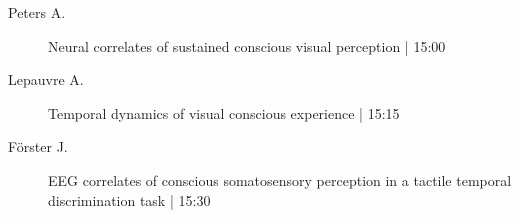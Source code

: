 \begin{symposium}
\begin{description}
                \item [ Peters A.] Neural correlates of sustained conscious visual perception \textcolor{mygray}{ | 15:00}    
                
                \item [ Lepauvre A.] Temporal dynamics of visual conscious experience \textcolor{mygray}{ | 15:15}    
                
                \item [ Förster J.] EEG correlates of conscious somatosensory perception in a tactile temporal discrimination task \textcolor{mygray}{ | 15:30}    
                
            \end{description} 
            \end{symposium}
            